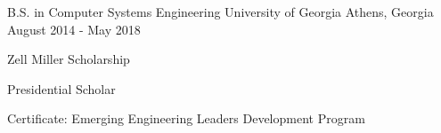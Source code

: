 \begin{cventries}
  \cventry
    {B.S. in Computer Systems Engineering}
    {University of Georgia}
    {Athens, Georgia}
    {August 2014 - May 2018}
    {
      \begin{cvitems}
        \item {Zell Miller Scholarship}
        \item {Presidential Scholar}
        \item {Certificate: Emerging Engineering Leaders Development Program}
      \end{cvitems}
    }
\end{cventries}